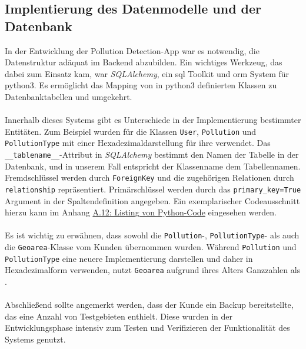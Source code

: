 \documentclass[a4paper,12pt]{article}
\begin{document}
\subsection{Implentierung des Datenmodelle und der Datenbank}
In der Entwicklung der \glqq Pollution Detection\grqq{}-App war es notwendig, die Datenstruktur adäquat im Backend abzubilden. Ein wichtiges Werkzeug, das dabei zum Einsatz kam, war \textit{SQLAlchemy}, ein \acrshort{sql} Toolkit und \gls{orm} System für \acrshort{python3}. Es ermöglicht das Mapping von in \acrshort{python3} definierten Klassen zu Datenbanktabellen und umgekehrt.\\
\\
Innerhalb dieses Systems gibt es Unterschiede in der Implementierung bestimmter Entitäten. Zum Beispiel wurden für die Klassen \texttt{User}, \texttt{Pollution} und \texttt{PollutionType}  mit einer Hexadezimaldarstellung für ihre  verwendet. Das \texttt{\_\_tablename\_\_}-Attribut in \textit{SQLAlchemy} bestimmt den Namen der Tabelle in der Datenbank, und in unserem Fall entspricht der Klassenname dem Tabellennamen. Fremdschlüssel werden durch \texttt{ForeignKey} und die zugehörigen Relationen durch \texttt{relationship} repräsentiert. Primärschlüssel werden durch das \texttt{primary\_key=True} Argument in der Spaltendefinition angegeben. Ein exemplarischer Codeausschnitt hierzu kann im Anhang \hyperref[sec:python-code]{A.12: Listing von Python-Code} eingesehen werden.\\
\\
Es ist wichtig zu erwähnen, dass sowohl die \texttt{Pollution}-, \texttt{PollutionType}- als auch die \texttt{Geoarea}-Klasse vom Kunden übernommen wurden. Während \texttt{Pollution} und \texttt{Pollu\-tion\-Type}
 eine neuere Implementierung darstellen und daher  in Hexadezimalform verwenden, nutzt \texttt{Geoarea} aufgrund ihres Alters Ganzzahlen als .\\
\\
Abschließend sollte angemerkt werden, dass der Kunde ein Backup bereitstellte, das eine Anzahl von Testgebieten enthielt. Diese wurden in der Entwicklungsphase intensiv zum Testen und Verifizieren der Funktionalität des Systems genutzt.
\end{document}
